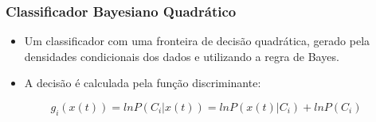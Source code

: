 \documentclass{beamer}
\begin{document}
\begin{frame}
\frametitle{Classificador Bayesiano Quadrático}
\begin{itemize} 
\item Um classificador com uma fronteira de decisão quadrática, gerado pela densidades condicionais dos dados e utilizando a regra de Bayes.
\item A decisão é calculada pela função discriminante:
\end{itemize}

\begin{theorem}
\[ g_i(x(t))= ln P(C_i|x(t))= ln P(x(t)|C_i)+ ln P(C_i)\]

\end{theorem}

\end{frame}
\end{document}
